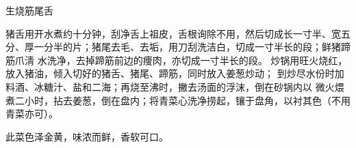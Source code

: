 \begin{recipe}{生烧筋尾舌}

\ingredients


\preparation

\step 猪舌用开水煮约十分钟，刮净舌上祖皮，舌根询除不用，然后切成长一寸半、宽五
分、厚一分半的片；猪尾去毛、去垢，用刀刮洗洁白，切成一寸半长的段；鲜猪蹄筋爪淸
水洗净，去掉蹄筋前边的痩肉，亦切成一寸半长的段。
\step 炒锅用旺火烧红，放入猪油，倾入切好的猪舌、猪尾、蹄筋，同时放入姜葱炒动；
到炒尽水份时加料酒、冰糖汁、盐和二海；再烧至沸时，撇去汤面的浮沫，倒在砂锅内以
微火煨煮二小时，拈去姜葱，倒在盘内；将青菜心洗净捞起，镶于盘角，以衬其色（不用
青菜亦可）。

\features

此菜色泽金黄，味浓而鲜，香软可口。

\end{recipe}

